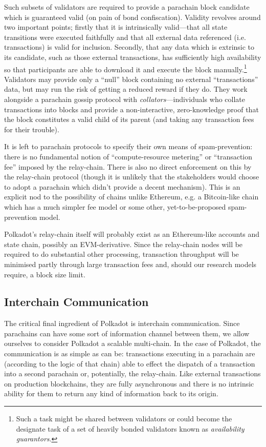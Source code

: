 \documentclass{beamer}
\makeatletter
\newcommand*\eg{e.g.\@\xspace}
\makeatother
\begin{document}
\begin{frame}
 Such subsets of validators are required to provide a parachain block candidate which is guaranteed valid (on pain of bond confiscation). Validity revolves around two important points; firstly that it is intrinsically valid---that all state transitions were executed faithfully and that all external data referenced (i.e. transactions) is valid for inclusion. Secondly, that any data which is extrinsic to its candidate, such as those external transactions, has sufficiently high availability so that participants are able to download it and execute the block manually.\footnote{Such a task might be shared between validators or could become the designate task of a set of heavily bonded validators known as \textit{availability guarantors}.} Validators may provide only a ``null'' block containing no external ``transactions'' data, but may run the risk of getting a reduced reward if they do. They work alongside a parachain gossip protocol with \emph{collators}---individuals who collate transactions into blocks and provide a non-interactive, zero-knowledge proof that the block constitutes a valid child of its parent (and taking any transaction fees for their trouble).

 It is left to parachain protocols to specify their own means of spam-prevention: there is no fundamental notion of ``compute-resource metering'' or ``transaction fee'' imposed by the relay-chain. There is also no direct enforcement on this by the relay-chain protocol (though it is unlikely that the stakeholders would choose to adopt a parachain which didn't provide a decent mechanism). This is an explicit nod to the possibility of chains unlike Ethereum, \eg a Bitcoin-like chain which has a much simpler fee model or some other, yet-to-be-proposed spam-prevention model.

 Polkadot's relay-chain itself will probably exist as an Ethereum-like accounts and state chain, possibly an EVM-derivative. Since the relay-chain nodes will be required to do substantial other processing, transaction throughput will be minimised partly through large transaction fees and, should our research models require, a block size limit.

\subsection{Interchain Communication}
\label{interchain-communication}

 The critical final ingredient of Polkadot is interchain communication. Since parachains can have some sort of information channel between them, we allow ourselves to consider Polkadot a scalable multi-chain. In the case of Polkadot, the communication is as simple as can be: transactions executing in a parachain are (according to the logic of that chain) able to effect the dispatch of a transaction into a second parachain or, potentially, the relay-chain. Like external transactions on production blockchains, they are fully asynchronous and there is no intrinsic ability for them to return any kind of information back to its origin.


\end{frame}
\end{document}
